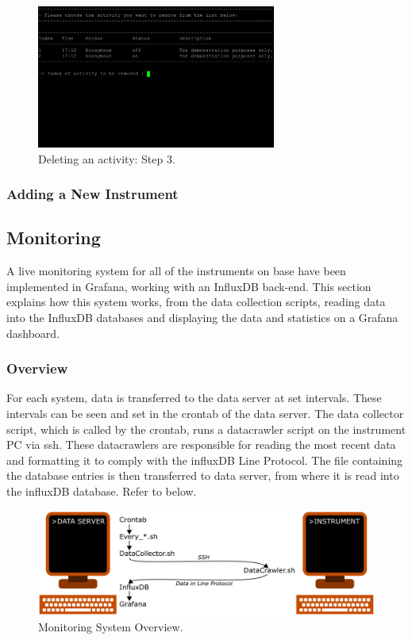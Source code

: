 \begin{enumerate}
		\begin{figure}[H]
			\centering
			\includegraphics[width=0.7\textwidth]{images/operations/delete_3.jpg}
			\caption{Deleting an activity: Step 3.}
			\label{fig:ops_del3}
		\end{figure}
\end{enumerate}

\subsubsection{Adding a New Instrument}

\clearpage

\subsection{Monitoring}
\label{subsec:ops_monitoring}
A live monitoring system for all of the instruments on base have been implemented in Grafana, working with an InfluxDB back-end. This section explains how this system works, from the data collection scripts, reading data into the InfluxDB databases and displaying the data and statistics on a Grafana dashboard.

\subsubsection{Overview}
For each system, data is transferred to the data server at set intervals. These intervals can be seen and set in the crontab of the data server. The data collector script, which is called by the crontab, runs a datacrawler script on the instrument PC via ssh. These datacrawlers are responsible for reading the most recent data and formatting it to comply with the influxDB Line Protocol. The file containing the database entries is then transferred to data server, from where it is read into the influxDB database. Refer to  below.
\par
\begin{figure}[H]
	\centering
	\includegraphics[width=\textwidth]{images/operations/grafana_graphic.pdf}
	\caption{Monitoring System Overview.}
	\label{fig:ops_monitoring}
\end{figure}

